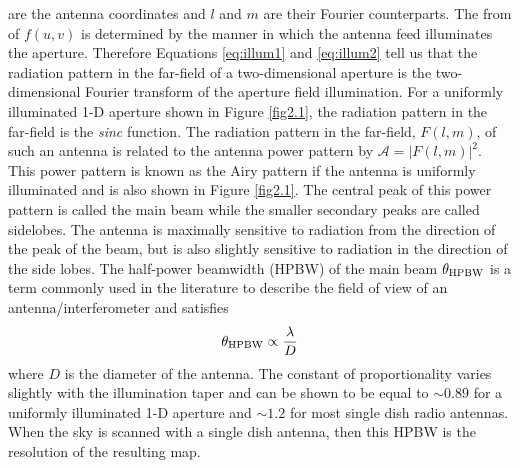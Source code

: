 are the antenna coordinates and $l$ and $m$ are their Fourier counterparts. The from of $f(u,v)$ is determined by the manner in which the antenna feed illuminates the aperture. Therefore Equations \ref{eq:illum1} and \ref{eq:illum2} tell us that the radiation pattern in the far-field of a two-dimensional aperture is the two-dimensional Fourier transform of the aperture field illumination. For a uniformly illuminated 1-D aperture shown in Figure \ref{fig2.1}, the radiation pattern in the far-field is the \textit{sinc} function. The radiation pattern in the far-field, $F(l,m)$, of such an antenna is related to the antenna power pattern by $\mathcal{A}=|F(l,m)|^2$. This power pattern is known as the Airy pattern if the antenna is uniformly illuminated and is also shown in Figure \ref{fig2.1}. The central peak of this power pattern is called the main beam while the smaller secondary peaks are called sidelobes. The antenna is maximally sensitive to radiation from the direction of the peak of the beam, but is also slightly sensitive to radiation in the direction of the side lobes. The half-power beamwidth (HPBW) of the main beam $\theta_{\rm{HPBW}}$ is a term commonly used in the literature to describe the field of view of an antenna/interferometer and satisfies 
\begin{equation}
\theta_{\rm{HPBW}} \propto \frac{\lambda}{D}
\end{equation}
where $D$ is the diameter of the antenna. The constant of proportionality varies slightly with the illumination taper and can be shown to be equal to $\sim 0.89$ for a uniformly illuminated 1-D aperture and $\sim 1.2$ for most single dish radio antennas. When the sky is scanned with a single dish antenna, then this HPBW is the resolution of the resulting map. 
